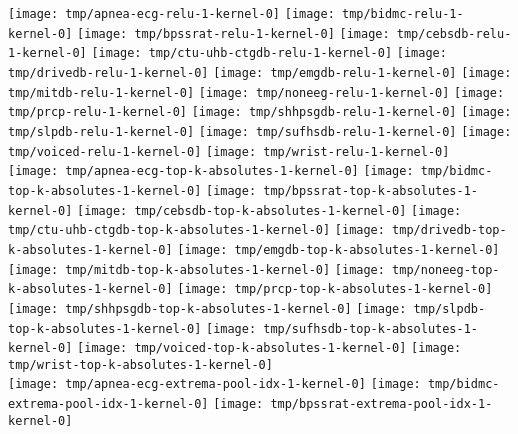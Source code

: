\documentclass[journal]{IEEEtran}
\begin{document}
\begin{figure*}[!t]
	\centering
	\texttt{[image: tmp/apnea-ecg-relu-1-kernel-0]}
	\texttt{[image: tmp/bidmc-relu-1-kernel-0]}
	\texttt{[image: tmp/bpssrat-relu-1-kernel-0]}
	\texttt{[image: tmp/cebsdb-relu-1-kernel-0]}
	\texttt{[image: tmp/ctu-uhb-ctgdb-relu-1-kernel-0]}
	\texttt{[image: tmp/drivedb-relu-1-kernel-0]}
	\texttt{[image: tmp/emgdb-relu-1-kernel-0]}
	\texttt{[image: tmp/mitdb-relu-1-kernel-0]}
	\texttt{[image: tmp/noneeg-relu-1-kernel-0]}
	\texttt{[image: tmp/prcp-relu-1-kernel-0]}
	\texttt{[image: tmp/shhpsgdb-relu-1-kernel-0]}
	\texttt{[image: tmp/slpdb-relu-1-kernel-0]}
	\texttt{[image: tmp/sufhsdb-relu-1-kernel-0]}
	\texttt{[image: tmp/voiced-relu-1-kernel-0]}
	\texttt{[image: tmp/wrist-relu-1-kernel-0]}
	\\
	\texttt{[image: tmp/apnea-ecg-top-k-absolutes-1-kernel-0]}
	\texttt{[image: tmp/bidmc-top-k-absolutes-1-kernel-0]}
	\texttt{[image: tmp/bpssrat-top-k-absolutes-1-kernel-0]}
	\texttt{[image: tmp/cebsdb-top-k-absolutes-1-kernel-0]}
	\texttt{[image: tmp/ctu-uhb-ctgdb-top-k-absolutes-1-kernel-0]}
	\texttt{[image: tmp/drivedb-top-k-absolutes-1-kernel-0]}
	\texttt{[image: tmp/emgdb-top-k-absolutes-1-kernel-0]}
	\texttt{[image: tmp/mitdb-top-k-absolutes-1-kernel-0]}
	\texttt{[image: tmp/noneeg-top-k-absolutes-1-kernel-0]}
	\texttt{[image: tmp/prcp-top-k-absolutes-1-kernel-0]}
	\texttt{[image: tmp/shhpsgdb-top-k-absolutes-1-kernel-0]}
	\texttt{[image: tmp/slpdb-top-k-absolutes-1-kernel-0]}
	\texttt{[image: tmp/sufhsdb-top-k-absolutes-1-kernel-0]}
	\texttt{[image: tmp/voiced-top-k-absolutes-1-kernel-0]}
	\texttt{[image: tmp/wrist-top-k-absolutes-1-kernel-0]}
	\\
	\texttt{[image: tmp/apnea-ecg-extrema-pool-idx-1-kernel-0]}
	\texttt{[image: tmp/bidmc-extrema-pool-idx-1-kernel-0]}
	\texttt{[image: tmp/bpssrat-extrema-pool-idx-1-kernel-0]}

\end{figure*}
\end{document}
